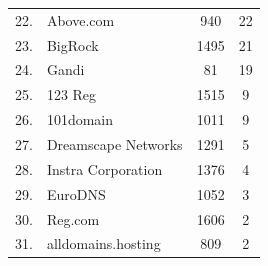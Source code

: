 \documentclass[11pt]{article}
\begin{document}
\begin{table}[htbp]
{\begin{tabular}{clcc}
            22. & Above.com & 940 & 22 \\
            23. & BigRock & 1495 & 21 \\
            24. & Gandi & 81 & 19 \\
            25. & 123 Reg & 1515 & 9 \\
            26. & 101domain & 1011 & 9 \\
            27. & Dreamscape Networks & 1291 & 5 \\
            28. & Instra Corporation & 1376 & 4 \\
            29. & EuroDNS & 1052 & 3 \\
            30. & Reg.com & 1606 & 2 \\
            31. & alldomains.hosting & 809 & 2 \\
        \bottomrule
    \end{tabular}
}
\end{table}
\end{document}
